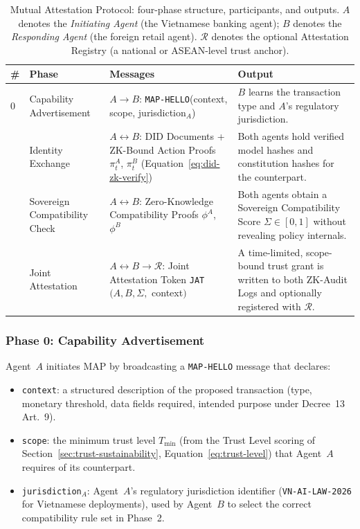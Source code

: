 \begin{table}[h]
\caption{Mutual Attestation Protocol: four-phase structure, participants,
         and outputs.  $A$ denotes the \emph{Initiating Agent} (the
         Vietnamese banking agent); $B$ denotes the \emph{Responding
         Agent} (the foreign retail agent).  $\mathcal{R}$ denotes the
         optional Attestation Registry (a national or ASEAN-level
         trust anchor).}
\label{tab:map-phases}
\begin{tabular}{p{0.5cm} p{2.4cm} p{4.0cm} p{5.2cm}}
\toprule
\textbf{\#} & \textbf{Phase} & \textbf{Messages} & \textbf{Output} \\
\midrule
0 & Capability Advertisement
  & $A \to B$: \texttt{MAP-HELLO}(context, scope, jurisdiction$_A$)
  & $B$ learns the transaction type and $A$'s regulatory jurisdiction. \\
\addlinespace
1 & Identity Exchange
  & $A \leftrightarrow B$: DID Documents + ZK-Bound Action Proofs
    $\pi^A_t$, $\pi^B_t$ (Equation~\ref{eq:did-zk-verify})
  & Both agents hold verified model hashes and constitution hashes
    for the counterpart. \\
\addlinespace
2 & Sovereign Compatibility Check
  & $A \leftrightarrow B$: Zero-Knowledge Compatibility Proofs
    $\phi^A$, $\phi^B$
  & Both agents obtain a Sovereign Compatibility Score
    $\Sigma \in [0,1]$ without revealing policy internals. \\
\addlinespace
3 & Joint Attestation
  & $A \leftrightarrow B \to \mathcal{R}$:
    Joint Attestation Token \texttt{JAT}$(A, B, \Sigma,$ context$)$
  & A time-limited, scope-bound trust grant is written to both
    ZK-Audit Logs and optionally registered with $\mathcal{R}$. \\
\bottomrule
\end{tabular}
\end{table}

\subsubsection*{Phase 0: Capability Advertisement}

Agent~$A$ initiates MAP by broadcasting a \texttt{MAP-HELLO} message that
declares:

\begin{itemize}
  \item \texttt{context}: a structured description of the proposed
        transaction (type, monetary threshold, data fields required,
        intended purpose under Decree~13 Art.~9).
  \item \texttt{scope}: the minimum trust level $T_{\min}$ (from the
        Trust Level scoring of Section~\ref{sec:trust-sustainability},
        Equation~\ref{eq:trust-level}) that Agent~$A$ requires of its
        counterpart.
  \item \texttt{jurisdiction}$_A$: Agent~$A$'s regulatory jurisdiction
        identifier (\texttt{VN-AI-LAW-2026} for Vietnamese deployments),
        used by Agent~$B$ to select the correct compatibility rule set
        in Phase~2.
\end{itemize}

